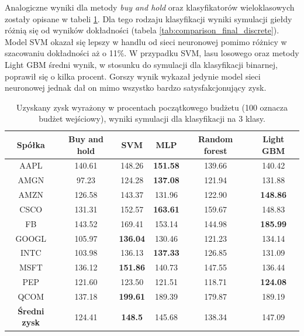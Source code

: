 \documentclass[a4paper, twoside, 11pt, openright]{article}
\begin{document}
Analogiczne wyniki dla metody \textit{buy and hold} oraz klasyfikatorów wieloklasowych zostały opisane w tabeli \ref{tab:comparison_simulation_discrete}. Dla tego rodzaju klasyfikacji wyniki symulacji giełdy różnią się od wyników dokładności (tabela \ref{tab:comparison_final_discrete}). Model SVM okazał się lepszy w handlu od sieci neuronowej pomimo różnicy w szacowaniu dokładności aż o 11\%.  W przypadku SVM, lasu losowego oraz metody Light GBM średni wynik, w stosunku do symulacji dla klasyfikacji binarnej, poprawił się o kilka procent. Gorszy wynik wykazał jedynie model sieci neuronowej jednak dał on mimo wszystko bardzo satysfakcjonujący zysk.

 \begin{table}[H]
    \centering
    \begin{tabular}{|c|c|c|c|c|c|}
    \hline
        \textbf{Spółka}  & \textbf{Buy and hold} & \textbf{SVM} &  \textbf{MLP}  &  \textbf{Random forest}  &  \textbf{Light GBM} \\ \hline
AAPL & 140.61 & 148.26  & \textbf{151.58}  & 139.66 & 140.42 \\ \hline
AMGN & 97.23 & 124.28  &  \textbf{137.08} & 121.94 &  131.88 \\ \hline
AMZN & 126.58 &  143.37 & 131.96 & 122.90 & \textbf{148.86} \\ \hline
CSCO & 131.31 & 152.57  & \textbf{163.61}  & 159.67 & 148.83  \\ \hline
FB   & 143.52 &  169.41 & 153.14 & 144.98 & \textbf{185.99} \\ \hline
GOOGL & 105.97 &  \textbf{136.04} & 130.46  & 121.23 & 134.14 \\ \hline
INTC & 103.98 & 136.13  & \textbf{137.33}  & 126.85 & 131.09 \\ \hline
MSFT &  136.12 & \textbf{151.86}  &  140.73  & 147.55 & 136.44 \\ \hline
PEP  & 121.60 &  123.50 & 121.51  & 118.71 & \textbf{124.08} \\ \hline
QCOM & 137.18 &  \textbf{199.61} & 189.39  & 179.87 & 189.19 \\ \hline \hline
\textbf{Średni zysk} & 124.41 & \textbf{148.5} & 145.68 & 138.34 & 147.09 \\  \hline  
    \end{tabular}
    \caption{Uzyskany zysk wyrażony w procentach początkowego budżetu (100 oznacza budżet wejściowy), wyniki symulacji dla klasyfikacji na 3 klasy.}
    \label{tab:comparison_simulation_discrete}
\end{table}   
\end{document}
